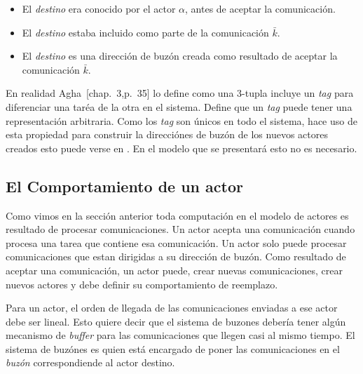 \begin{itemize}
 \item El \textit{destino} era conocido por el actor $\alpha$, antes de aceptar la comunicación.
 \item El \textit{destino} estaba incluido como parte de la comunicación $\bar{k}$.
 \item El \textit{destino} es una dirección de buzón creada como resultado de aceptar la comunicación $\bar{k}$.
\end{itemize}

En realidad Agha\ [chap.~3,p.~35]\cite{Agha:1986:AMC:7929} lo define como una 3-tupla incluye un \textit{tag} para diferenciar una taréa de la otra en el sistema. Define que un \textit{tag} puede tener una representación arbitraria. Como los \textit{tag} son únicos en todo el sistema, hace uso de esta propiedad para construir la direcciónes de buzón de los nuevos actores creados esto puede verse en \cite[chap.~5,p.~104]{Agha:1986:AMC:7929}. En el modelo que se presentará esto no es necesario.


\subsection{El Comportamiento de un actor}

Como vimos en la sección anterior toda computación en el modelo de actores es resultado de procesar comunicaciones. Un actor acepta una comunicación cuando procesa una tarea que contiene esa comunicación. Un actor solo puede procesar comunicaciones que estan dirigidas a su dirección de buzón. Como resultado de aceptar una comunicación, un actor puede, crear nuevas comunicaciones, crear nuevos actores y debe definir su comportamiento de reemplazo.

Para un actor, el orden de llegada de las comunicaciones enviadas a ese actor debe ser lineal. Esto quiere decir que el sistema de buzones debería tener algún mecanismo de \textit{buffer} para las comunicaciones que llegen casi al mismo tiempo. El sistema de buzónes es quien está encargado de poner las comunicaciones en el \textit{buzón} correspondiende al actor destino. 

